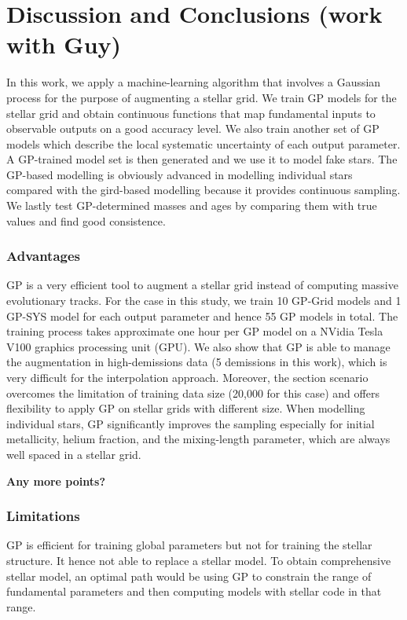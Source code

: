 \section{Discussion and Conclusions (work with Guy)}\label{sec:conclusion}

In this work, we apply a machine-learning algorithm that involves a Gaussian process for the purpose of augmenting a stellar grid. We train GP models for the stellar grid and obtain continuous functions that map fundamental inputs to observable outputs on a good accuracy level. We also train another set of GP models which describe the local systematic uncertainty of each output parameter. A GP-trained model set is then generated and we use it to model fake stars. The GP-based modelling is obviously advanced in modelling individual stars compared with the gird-based modelling because it provides continuous sampling. We lastly test GP-determined masses and ages by comparing them with true values and find good consistence. 

\subsubsection*{Advantages}
GP is a very efficient tool to augment a stellar grid instead of computing massive evolutionary tracks. For the case in this study, we train 10 GP-Grid models and 1 GP-SYS model for each output parameter and hence 55 GP models in total. The training process takes approximate one hour per GP model on a NVidia Tesla V100 graphics processing unit (GPU). 
%
We also show that GP is able to manage the augmentation in high-demissions data (5 demissions in this work), which is very difficult for the interpolation approach.
%
Moreover, the section scenario overcomes the limitation of training data size (20,000 for this case) and offers flexibility to apply GP on stellar grids with different size. 
%
When modelling individual stars, GP significantly improves the sampling especially for initial metallicity, helium fraction, and the mixing-length parameter, which are always well spaced in a stellar grid. 
%

{\bf Any more points?}    

\subsubsection*{Limitations}
GP is efficient for training global parameters but not for training the stellar structure. It hence not able to replace a stellar model. To obtain comprehensive stellar model, an optimal path would be using GP to constrain the range of fundamental parameters and then computing models with stellar code in that range.
%

